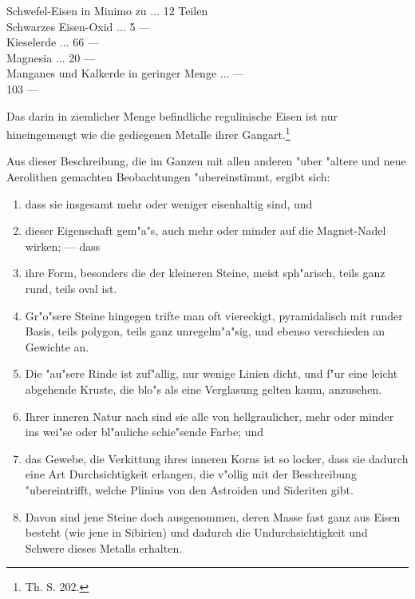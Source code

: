 \documentclass[a4paper, 11pt, oneside, polutonikogreek, german]{article}
\begin{document}
Schwefel-Eisen in Minimo zu ... 12 Teilen\\
\hspace*{0.5cm} Schwarzes Eisen-Oxid ... 5 ---\\
\hspace*{0.5cm} Kieselerde ... 66 ---\\
\hspace*{0.5cm} Magnesia ... 20 ---\\
\hspace*{0.5cm} Manganes und Kalkerde in geringer Menge ... ---\\
\hspace*{2.5cm} 103 ---

Das darin in ziemlicher Menge befindliche regulinische Eisen ist nur hineingemengt wie die gediegenen Metalle ihrer Gangart.\footnote{ Th. S. 202.}

Aus dieser Beschreibung, die im Ganzen mit allen anderen "uber "altere und neue Aerolithen gemachten Beobachtungen "ubereinstimmt, ergibt sich:
\begin{enumerate}
    \item dass sie insgesamt mehr oder weniger eisenhaltig sind, und
    \item dieser Eigenschaft gem"a"s, auch mehr oder minder auf die Magnet-Nadel wirken; --- dass
    \item ihre Form, besonders die der kleineren Steine, meist sph"arisch, teils ganz rund, teils oval ist.
    \item Gr"o"sere Steine hingegen trifte man oft viereckigt, pyramidalisch mit runder Basis, teils polygon, teils ganz unregelm"a"sig, und ebenso verschieden an Gewichte an.
    \item Die "au"sere Rinde ist zuf"allig, nur wenige Linien dicht, und f"ur eine leicht abgehende Kruste, die blo"s als eine Verglasung gelten kaum, anzusehen.
    \item Ihrer inneren Natur nach sind sie alle von hellgraulicher, mehr oder minder ins wei"se oder bl"auliche schie"sende Farbe; und
    \item das Gewebe, die Verkittung ihres inneren Korns ist so locker, dass sie dadurch eine Art Durchsichtigkeit erlangen, die v"ollig mit der Beschreibung "ubereintrifft, welche Plinius von den Astroiden und Sideriten gibt.
    \item Davon sind jene Steine doch ausgenommen, deren Masse fast ganz aus Eisen besteht (wie jene in Sibirien) und dadurch die Undurchsichtigkeit und Schwere dieses Metalls erhalten.
\end{enumerate}
\end{document}
